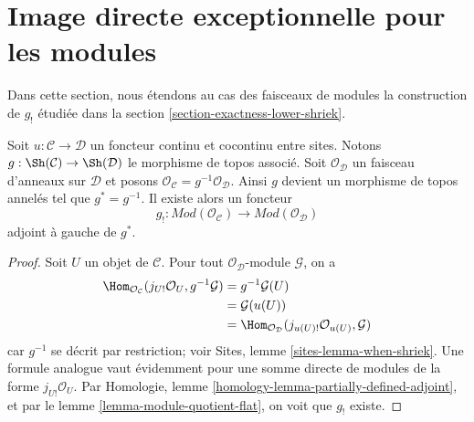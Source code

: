 \section{Image directe exceptionnelle pour les modules}
\label{section-lower-shriek-modules}

\noindent
Dans cette section, nous étendons au cas des faisceaux de modules la
construction de $g_!$ étudiée dans la section
\ref{section-exactness-lower-shriek}.

\begin{lemma}
\label{lemma-lower-shriek-modules}
Soit $u : \mathcal{C} \to \mathcal{D}$ un foncteur continu et cocontinu entre
sites. Notons $g : \Sh(\mathcal{C}) \to \Sh(\mathcal{D})$ le morphisme de
topos associé. Soit $\mathcal{O}_\mathcal{D}$ un faisceau d'anneaux sur
$\mathcal{D}$ et posons
$\mathcal{O}_\mathcal{C} = g^{-1}\mathcal{O}_\mathcal{D}$. Ainsi $g$ devient
un morphisme de topos annelés tel que $g^* = g^{-1}$. Il existe alors un foncteur
$$
g_! :
\textit{Mod}(\mathcal{O}_\mathcal{C})
\longrightarrow
\textit{Mod}(\mathcal{O}_\mathcal{D})
$$
adjoint à gauche de $g^*$.
\end{lemma}

\begin{proof}
Soit $U$ un objet de $\mathcal{C}$. Pour tout
$\mathcal{O}_\mathcal{D}$-module $\mathcal{G}$, on a
\begin{align*}
\Hom_{\mathcal{O}_\mathcal{C}}(j_{U!}\mathcal{O}_U, g^{-1}\mathcal{G})
& =
g^{-1}\mathcal{G}(U) \\
& =
\mathcal{G}(u(U)) \\
& =
\Hom_{\mathcal{O}_\mathcal{D}}(j_{u(U)!}\mathcal{O}_{u(U)}, \mathcal{G})
\end{align*}
car $g^{-1}$ se décrit par restriction; voir Sites,
lemme \ref{sites-lemma-when-shriek}. Une formule analogue vaut évidemment
pour une somme directe de modules de la forme $j_{U!}\mathcal{O}_U$. Par
Homologie, lemme \ref{homology-lemma-partially-defined-adjoint}, et par le
lemme \ref{lemma-module-quotient-flat}, on voit que $g_!$ existe.
\end{proof}

